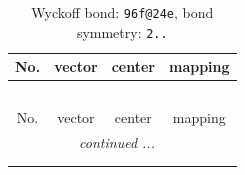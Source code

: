 \documentclass[fleqn,8pt]{jsarticle}
\begin{document}
\renewcommand{\arraystretch}{1.2}
\begin{longtable}{cccc}
\caption{Wyckoff bond: {\tt 96f@24e}, bond symmetry: {\tt 2..}}
 \\
 \hline \hline
No. & vector & center & mapping \\ \hline \endfirsthead

\multicolumn{3}{l}{\tablename\ \thetable{}} \\
 \hline \hline
No. & vector & center & mapping \\ \hline \endhead

 \hline \hline
\multicolumn{3}{r}{\footnotesize\it continued ...} \\ \endfoot

 \hline \hline
\multicolumn{3}{r}{} \\ \endlastfoot


\end{longtable}
\end{document}
